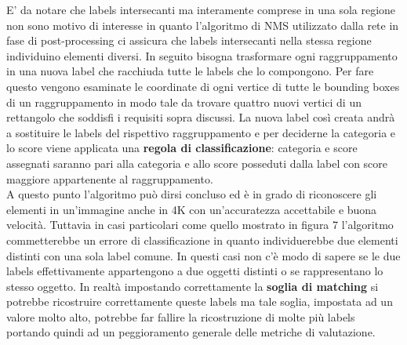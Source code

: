 E' da notare che labels intersecanti ma interamente comprese in una sola regione non sono motivo di interesse in quanto l'algoritmo di NMS utilizzato dalla rete in fase di post-processing ci assicura che labels intersecanti nella stessa regione individuino elementi diversi.
In seguito bisogna trasformare ogni raggruppamento in una nuova label che racchiuda tutte le labels che lo compongono. Per fare questo vengono esaminate le coordinate di ogni vertice di tutte le bounding boxes di un raggruppamento in modo tale da trovare quattro nuovi vertici di un rettangolo che soddisfi i requisiti sopra discussi. La nuova label così creata andrà a sostituire le labels del rispettivo raggruppamento e per deciderne la categoria e lo score viene applicata una \textbf{regola di classificazione}: categoria e score assegnati saranno pari alla categoria e allo score posseduti dalla label con score maggiore appartenente al raggruppamento.\\
A questo punto l'algoritmo può dirsi concluso ed è in grado di riconoscere gli elementi in un'immagine anche in 4K con un'accuratezza accettabile e buona velocità. Tuttavia in casi particolari come quello mostrato in figura 7 l'algoritmo commetterebbe un errore di classificazione in quanto individuerebbe due elementi distinti con una sola label comune. In questi casi non c'è modo di sapere se le due labels effettivamente appartengono a due oggetti distinti o se rappresentano lo stesso oggetto. In realtà impostando correttamente la \textbf{soglia di matching} si potrebbe ricostruire correttamente queste labels ma tale soglia, impostata ad un valore molto alto, potrebbe far fallire la ricostruzione di molte più labels portando quindi ad un peggioramento generale delle metriche di valutazione. 
